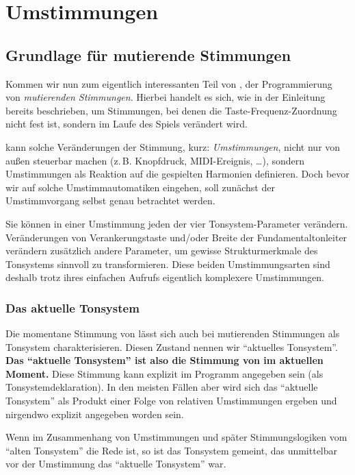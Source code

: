 \chapter{Umstimmungen}\label{cha:umstimmungen}
\section{Grundlage für mutierende Stimmungen}\label{sec:grundl-fur-muti}
Kommen wir nun zum eigentlich interessanten Teil von \mutabor{}, der
Programmierung von \emph{mutierenden Stimmungen}. Hierbei handelt es
sich, wie in der Einleitung bereits beschrieben, um Stimmungen, bei
denen die Taste-Frequenz-Zuordnung nicht fest ist, sondern im Laufe
des Spiels verändert wird.

\mutabor{} kann solche Veränderungen der Stimmung, kurz: \emph{Umstimmungen},
nicht nur von außen steuerbar machen (z.\,B. Knopfdruck, MIDI-Ereignis,
\dots), sondern Umstimmungen als Reaktion auf die gespielten Harmonien
definieren. Doch bevor wir auf solche Umstimmautomatiken eingehen,
soll zunächst der Umstimmvorgang selbst genau betrachtet werden.

Sie können in einer Umstimmung jeden der vier Tonsystem-Parameter
verändern. Veränderungen von Verankerungstaste und/oder Breite der
Fundamentaltonleiter verändern zusätzlich andere Parameter, um gewisse
Strukturmerkmale des Tonsystems sinnvoll zu transformieren. Diese
beiden Umstimmungsarten sind deshalb trotz ihres einfachen Aufrufs
eigentlich komplexere Umstimmungen.

\subsection{Das aktuelle Tonsystem}\label{sec:das-aktu-tonsyst}
Die momentane Stimmung von \mutabor{} lässt sich auch
bei mutierenden Stimmungen als Tonsystem charakterisieren. Diesen
Zustand nennen wir "`aktuelles Tonsystem"'. \textbf{Das "`aktuelle Tonsystem"'
ist also die Stimmung von \mutabor{} im aktuellen
Moment.} Diese Stimmung kann explizit im Programm angegeben sein
(als Tonsystemdeklaration). In den meisten Fällen aber wird sich
das "`aktuelle Tonsystem"' als Produkt einer Folge von relativen
Umstimmungen ergeben und nirgendwo explizit angegeben worden sein.

Wenn im Zusammenhang von Umstimmungen und später Stimmungslogiken
vom "`alten Tonsystem"' die Rede ist, so ist das Tonsystem gemeint,
das unmittelbar vor der Umstimmung das "`aktuelle Tonsystem"' war.

